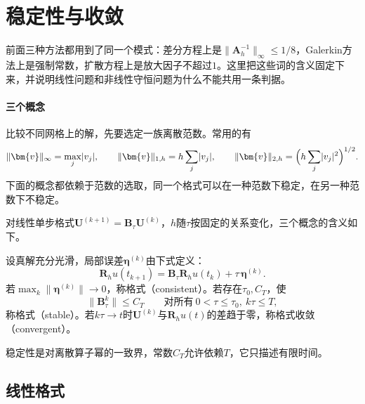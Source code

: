 \section{稳定性与收敛}
\label{sec:pdenum-stability}

前面三种方法都用到了同一个模式：差分方程上是$\lVert\bm{A}_h^{-1}\rVert_\infty\leq1/8$，Galerkin方法上是强制常数，扩散方程上是放大因子不超过$1$。这里把这些词的含义固定下来，并说明线性问题和非线性守恒问题为什么不能共用一条判据。

\paragraph{三个概念}
比较不同网格上的解，先要选定一族离散范数。常用的有
\[
 \lVert\bm{v}\rVert_{\infty}=\max_j\lvert v_j\rvert,\qquad
 \lVert\bm{v}\rVert_{1,h}=h\sum_j\lvert v_j\rvert,\qquad
 \lVert\bm{v}\rVert_{2,h}=\Bigl(h\sum_j\lvert v_j\rvert^2\Bigr)^{1/2}.
\]
下面的概念都依赖于范数的选取，同一个格式可以在一种范数下稳定，在另一种范数下不稳定。

对线性单步格式$\bm{U}^{(k+1)}=\bm{B}_\tau\bm{U}^{(k)}$，$h$随$\tau$按固定的关系变化，三个概念的含义如下。

\begin{definition}
 \label{def:pdenum-consistency-stability}
 设真解充分光滑，局部误差$\bm{\eta}^{(k)}$由下式定义：
 \begin{equation}
  \bm{R}_hu(t_{k+1})=\bm{B}_\tau\bm{R}_hu(t_k)+\tau\,\bm{\eta}^{(k)} .
  \label{eq:pdenum-local-error}
 \end{equation}
 若$\max_k\lVert\bm{\eta}^{(k)}\rVert\to0$，称格式（consistent）。若存在$\tau_0,C_T$，使
 \begin{equation}
  \lVert\bm{B}_\tau^k\rVert\leq C_T\qquad\text{对所有}\ 0<\tau\leq\tau_0,\ k\tau\leq T,
  \label{eq:pdenum-stable}
 \end{equation}
 称格式（stable）。若$k\tau\to t$时$\bm{U}^{(k)}$与$\bm{R}_hu(t)$的差趋于零，称格式收敛（convergent）。
\end{definition}

稳定性是对离散算子幂的一致界，常数$C_T$允许依赖$T$，它只描述有限时间。

\subsection{线性格式}
\label{sec:pdenum-linear}

